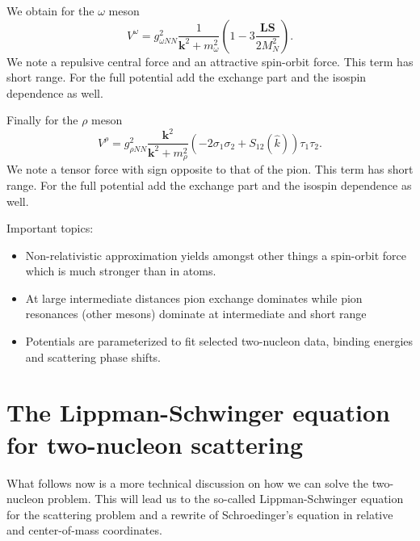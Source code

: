 \documentclass[graybox,sectrefs,envcountresetchap,open=right]{svmonodo}
\begin{document}
We obtain
for the $\omega$ meson
\[
V^{\omega}= g_{\omega NN}^{2}\frac{1}{\mathbf{k}^{2}+m_{\omega}^{2}}\left (1-3\frac{\mathbf{LS}}{2M_N^2}\right).
\]
We note a repulsive central force and an attractive spin-orbit force. This term has  short range.
For the full potential add the exchange part and the isospin dependence as well.


Finally 
for the $\rho$ meson
\[
V^{\rho}= g_{\rho NN}^{2}\frac{\mathbf{k}^{2}}{\mathbf{k}^{2}+m_{\rho}^{2}}\left (
-2\sigma_{1}\sigma_{2}+S_{12}(\hat{k})\right)\tau_{1}\tau_{2}.
\]
We note a tensor force with sign opposite to that of the pion. This term has  short range. For the full potential add the exchange part and the isospin dependence as well.

\noindent
Important topics:

\begin{itemize}

\item Non-relativistic approximation yields amongst other things a spin-orbit force which is much stronger than in atoms.

\item At large intermediate distances pion exchange dominates while  pion resonances (other mesons) dominate at intermediate and short range 


\item Potentials are parameterized to fit selected two-nucleon data, binding energies and scattering phase shifts.


\end{itemize}

\noindent
\section{The Lippman-Schwinger equation for two-nucleon scattering}

What follows now is a more technical discussion on how we can solve the two-nucleon problem.
This will lead us to the so-called Lippman-Schwinger equation for the scattering problem and a rewrite of Schroedinger's equation in relative and center-of-mass coordinates. 
\end{document}
